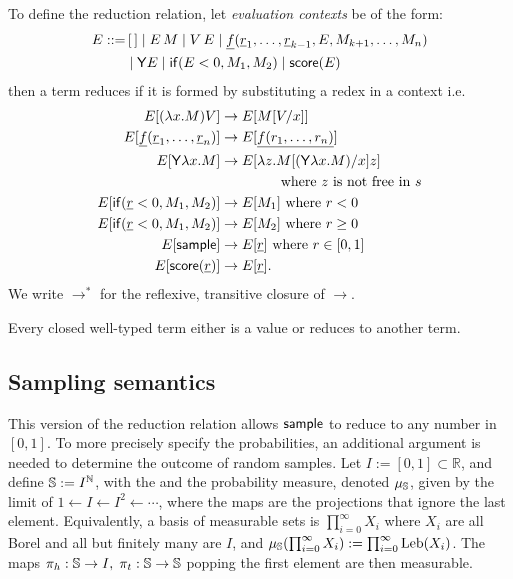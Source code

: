 To define the reduction relation, let \emph{evaluation contexts} be of the form:
\begin{align*}
  E ::= & \, [\,] \mid E \, M \mid V \, E \mid \underline{f}(\underline r_1,\dots ,\underline r_{k-1}, E, M_{k+1}, \dots, M_n) \\ & \mid \mathsf{Y} E \mid \mathsf{if}(E<0, M_1, M_2) \mid \mathsf{score} (E)
\end{align*}
then a term reduces if it is formed by substituting a redex in a context i.e.
\begin{align*}
  E[(\lambda x.M) V] & \to E[M[V/x]] \\
  E[\underline f (\underline r_1, \dots , \underline r_n)] & \to E[\underline{f(r_1,\dots,r_n)}] \\
  E[\mathsf{Y} \lambda x. M] & \to E[\lambda z. M[(\mathsf{Y} \lambda x. M)/x] z] \\
  & \qquad \qquad \text{ where $z$ is not free in $s$}\\
  E[\mathsf{if}(\underline r < 0, M_1, M_2)] & \to E[M_1] \text{ where }r < 0 \\
  E[\mathsf{if}(\underline r < 0, M_1, M_2)] & \to E[M_2] \text{ where }r \geq 0 \\
  E[\mathsf{sample}] & \to E[\underline r] \text{ where } r \in [0,1] \\
  E[\mathsf{score}(\underline r)] & \to E[\underline r].
\end{align*}
We write $\to^\ast$ for the reflexive, transitive closure of $\to$.

Every closed well-typed term either is a value or reduces to another term.

\subsection{Sampling semantics}
\label{sec:sampling semantics}
This version of the reduction relation allows $\mathsf{sample}$ to reduce to any number in $[0,1]$. 
To more precisely specify the probabilities, an additional argument is needed to determine the outcome of random samples. Let $ I := [0,1] \subset \mathbb{R} $, and define ${\mathbb{S}} := I^{\mathbb{N}}$, with the  and the probability measure, denoted $\mu_{{\mathbb{S}}}$, given by the limit of $1 \gets I \gets I^2 \gets \cdots$, where the maps are the projections that ignore the last element. Equivalently, a basis of measurable sets is $\prod_{i=0}^\infty X_i$ where $X_i$ are all Borel and all but finitely many are $I$, and $\mu_{{\mathbb{S}}} (\prod_{i=0}^\infty X_i) := \prod_{i=0}^\infty \mathrm{Leb}(X_i)$.
The maps $\pi_h:{\mathbb{S}} \to I, \; \pi_t:{\mathbb{S}} \to {\mathbb{S}}$ popping the first element are then measurable.

